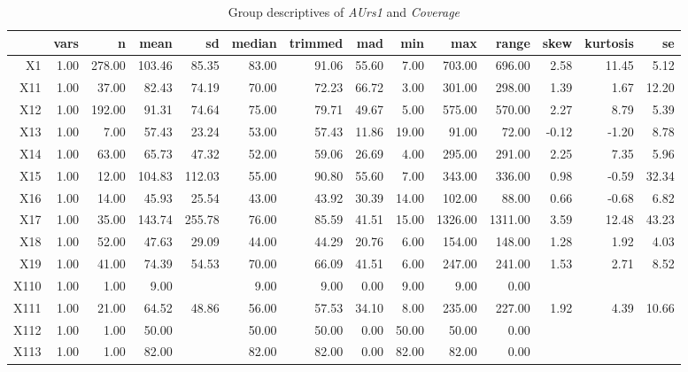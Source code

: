 \begin{table}[ht]
	\small
	\centering
	\begin{tabular}{rrrrrrrrrrrrrr}
		\hline
	   & vars & n & mean & sd & median & trimmed & mad & min & max & range & skew & kurtosis & se \\ 
		\hline
	  X1 & 1.00 & 278.00 & 103.46 & 85.35 & 83.00 & 91.06 & 55.60 & 7.00 & 703.00 & 696.00 & 2.58 & 11.45 & 5.12 \\ 
		X11 & 1.00 & 37.00 & 82.43 & 74.19 & 70.00 & 72.23 & 66.72 & 3.00 & 301.00 & 298.00 & 1.39 & 1.67 & 12.20 \\ 
		X12 & 1.00 & 192.00 & 91.31 & 74.64 & 75.00 & 79.71 & 49.67 & 5.00 & 575.00 & 570.00 & 2.27 & 8.79 & 5.39 \\ 
		X13 & 1.00 & 7.00 & 57.43 & 23.24 & 53.00 & 57.43 & 11.86 & 19.00 & 91.00 & 72.00 & -0.12 & -1.20 & 8.78 \\ 
		X14 & 1.00 & 63.00 & 65.73 & 47.32 & 52.00 & 59.06 & 26.69 & 4.00 & 295.00 & 291.00 & 2.25 & 7.35 & 5.96 \\ 
		X15 & 1.00 & 12.00 & 104.83 & 112.03 & 55.00 & 90.80 & 55.60 & 7.00 & 343.00 & 336.00 & 0.98 & -0.59 & 32.34 \\ 
		X16 & 1.00 & 14.00 & 45.93 & 25.54 & 43.00 & 43.92 & 30.39 & 14.00 & 102.00 & 88.00 & 0.66 & -0.68 & 6.82 \\ 
		X17 & 1.00 & 35.00 & 143.74 & 255.78 & 76.00 & 85.59 & 41.51 & 15.00 & 1326.00 & 1311.00 & 3.59 & 12.48 & 43.23 \\ 
		X18 & 1.00 & 52.00 & 47.63 & 29.09 & 44.00 & 44.29 & 20.76 & 6.00 & 154.00 & 148.00 & 1.28 & 1.92 & 4.03 \\ 
		X19 & 1.00 & 41.00 & 74.39 & 54.53 & 70.00 & 66.09 & 41.51 & 6.00 & 247.00 & 241.00 & 1.53 & 2.71 & 8.52 \\ 
		X110 & 1.00 & 1.00 & 9.00 &  & 9.00 & 9.00 & 0.00 & 9.00 & 9.00 & 0.00 &  &  &  \\ 
		X111 & 1.00 & 21.00 & 64.52 & 48.86 & 56.00 & 57.53 & 34.10 & 8.00 & 235.00 & 227.00 & 1.92 & 4.39 & 10.66 \\ 
		X112 & 1.00 & 1.00 & 50.00 &  & 50.00 & 50.00 & 0.00 & 50.00 & 50.00 & 0.00 &  &  &  \\ 
		X113 & 1.00 & 1.00 & 82.00 &  & 82.00 & 82.00 & 0.00 & 82.00 & 82.00 & 0.00 &  &  &  \\ 
		 \hline
	  \end{tabular}
    \caption{Group descriptives of \textit{AUrs1} and \textit{Coverage}}
    \label{tbl:descriptives_baysis_effector_AUrs1_Cov}
\end{table}

